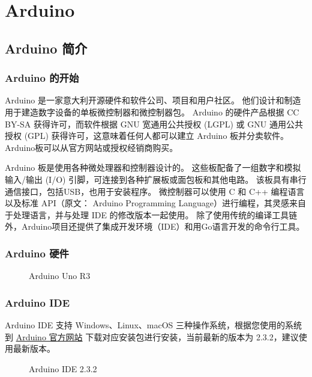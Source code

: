 \documentclass[xcolor=table,dvipsnames,svgnames,aspectratio=169]{ctexbeamer}
\begin{document}
\section{Arduino}

\subsection{Arduino 简介}

\begin{frame}
  \frametitle{Arduino 的开始}

  Arduino 是一家意大利开源硬件和软件公司、项目和用户社区。 他们设计和制造用于建造数字设备的单板微控制器和微控制器包。 Arduino 的硬件产品根据 CC BY-SA 获得许可，而软件根据 GNU 宽通用公共授权 (LGPL) 或 GNU 通用公共授权 (GPL) 获得许可，这意味着任何人都可以建立 Arduino 板并分卖软件。 Arduino板可以从官方网站或授权经销商购买。

  Arduino 板是使用各种微处理器和控制器设计的。 这些板配备了一组数字和模拟输入/输出 (I/O) 引脚，可连接到各种扩展板或面包板和其他电路。 该板具有串行通信接口，包括USB，也用于安装程序。 微控制器可以使用 C 和 C++ 编程语言以及标准 API（原文： Arduino Programming Language）进行编程，其灵感来自于处理语言，并与处理 IDE 的修改版本一起使用。 除了使用传统的编译工具链外，Arduino项目还提供了集成开发环境（IDE）和用Go语言开发的命令行工具。

\end{frame}

\begin{frame}
  \frametitle{Arduino 硬件}

    \begin{figure}
    \centering
    \caption{Arduino Uno R3}
  \end{figure}
\end{frame}

\begin{frame}
  \frametitle{Arduino IDE}

  Arduino IDE 支持 Windows、Linux、macOS 三种操作系统，根据您使用的系统到 \href{https://www.arduino.cc/en/software}{Arduino 官方网站} 下载对应安装包进行安装，当前最新的版本为 2.3.2，建议使用最新版本。

    \begin{figure}
    \centering
    \caption{Arduino IDE 2.3.2}
  \end{figure}
\end{frame}
\end{document}
